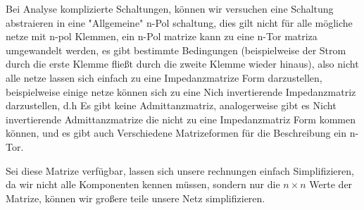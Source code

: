 %
%
%
Bei Analyse komplizierte Schaltungen, können wir versuchen eine Schaltung abstraieren in eine "Allgemeine" n-Pol schaltung, dies gilt nicht für alle mögliche netze mit n-pol Klemmen, ein n-Pol matrize kann zu eine n-Tor matriza umgewandelt werden, es gibt bestimmte Bedingungen (beispielweise der Strom durch die erste Klemme fließt durch die zweite Klemme wieder hinaus), also nicht alle netze lassen sich einfach zu eine Impedanzmatrize Form darzustellen, beispielweise einige netze können sich zu eine Nich invertierende Impedanzmatriz darzustellen, d.h Es gibt keine Admittanzmatriz, analogerweise gibt es Nicht invertierende Admittanzmatrize die nicht zu eine Impedanzmatriz Form kommen können, und es gibt auch Verschiedene Matrizeformen für die Beschreibung ein n-Tor. 

Sei diese Matrize verfügbar, lassen sich unsere rechnungen einfach Simplifizieren, da wir nicht alle Komponenten kennen müssen, sondern nur die $n\times n$ Werte der Matrize, können wir großere teile unsere Netz simplifizieren.
%
\begin{flushright}
  \textit{\autorA}
\end{flushright}
%
%
%
%